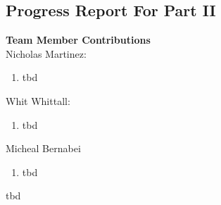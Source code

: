 \documentclass[paper=a4, fontsize=11pt]{scrartcl} %
\numberwithin{equation}{section} %
\numberwithin{figure}{section} %
\numberwithin{table}{section} %
\begin{document}
\newpage


%
\subsection{Progress Report For Part II}
\begin{framed}

\textbf{Team Member Contributions} \\
Nicholas Martinez:
\begin{enumerate}
    \item tbd
\end{enumerate}
Whit Whittall:
\begin{enumerate}
    \item tbd
\end{enumerate}
Micheal Bernabei
\begin{enumerate}
    \item tbd
\end{enumerate}

 tbd

\end{framed}


\newpage
\end{document}
